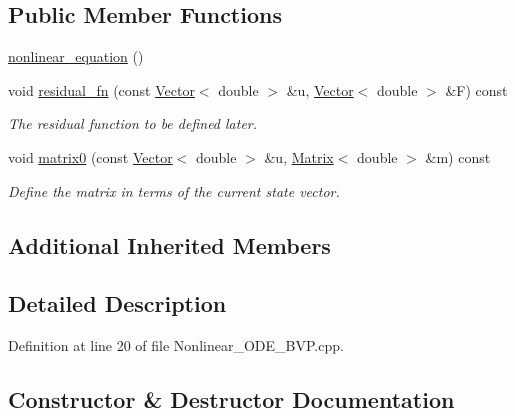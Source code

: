 \subsection*{Public Member Functions}
\begin{DoxyCompactItemize}
\item 
\hyperlink{classLuna_1_1nonlinear__equation_ad9742a2d1179a22a9bf369f1ed1ce8ff}{nonlinear\+\_\+equation} ()
\item 
void \hyperlink{classLuna_1_1nonlinear__equation_a5acffbdc83b8b487241cd92b0191be85}{residual\+\_\+fn} (const \hyperlink{classLuna_1_1Vector}{Vector}$<$ double $>$ \&u, \hyperlink{classLuna_1_1Vector}{Vector}$<$ double $>$ \&F) const
\begin{DoxyCompactList}\small\item\em The residual function to be defined later. \end{DoxyCompactList}\item 
void \hyperlink{classLuna_1_1nonlinear__equation_a467d48cbfdb69fddc877e00dc24a397a}{matrix0} (const \hyperlink{classLuna_1_1Vector}{Vector}$<$ double $>$ \&u, \hyperlink{classLuna_1_1Matrix}{Matrix}$<$ double $>$ \&m) const
\begin{DoxyCompactList}\small\item\em Define the matrix in terms of the current state vector. \end{DoxyCompactList}\end{DoxyCompactItemize}
\subsection*{Additional Inherited Members}


\subsection{Detailed Description}


Definition at line 20 of file Nonlinear\+\_\+\+O\+D\+E\+\_\+\+B\+V\+P.\+cpp.



\subsection{Constructor \& Destructor Documentation}
\mbox{\label{classLuna_1_1nonlinear__equation_ad9742a2d1179a22a9bf369f1ed1ce8ff}} 
